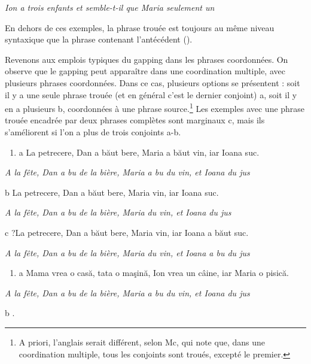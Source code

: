 {\itshape
Ion a trois enfants et semble-t-il que Maria seulement un} 

En dehors de ces exemples, la phrase trouée est toujours au même niveau syntaxique que la phrase contenant l'antécédent (\citet{Lobeck1995}).

Revenons aux emplois typiques du gapping dans les phrases coordonnées. On observe que le gapping peut apparaître dans une coordination multiple, avec plusieurs phrases coordonnées. Dans ce cas, plusieurs options se présentent : soit il y a une seule phrase trouée (et en général c'est le dernier conjoint) a, soit il y en a plusieurs b, coordonnées à une phrase source.\footnote{A priori, l'anglais serait différent, selon Mc\citet{Cawley1988}, qui note que, dans une coordination multiple, tous les conjoints sont troués, excepté le premier.} Les exemples avec une phrase trouée encadrée par deux phrases complètes sont marginaux c, mais ils s'améliorent si l'on a plus de trois conjoints a-b. 


\begin{enumerate}
\item \label{bkm:Ref289092187}a  La petrecere, Dan a băut bere, Maria a băut vin, iar Ioana suc.


\end{enumerate}
{\itshape
A la fête, Dan a bu de la bière, Maria a bu du vin, et Ioana du jus  } 

  b  La petrecere, Dan a băut bere, Maria vin, iar Ioana suc.

{\itshape
A la fête, Dan a bu de la bière, Maria du vin, et Ioana du jus } 

  c  ?La petrecere, Dan a băut bere, Maria vin, iar Ioana a băut suc.

{\itshape
A la fête, Dan a bu de la bière, Maria du vin, et Ioana a bu du jus}


\begin{enumerate}
\item \label{bkm:Ref289092617}a  Mama vrea o casă, tata o maşină, Ion vrea un câine, iar Maria o pisică.


\end{enumerate}
{\itshape
  A la fête, Dan a bu de la bière, Maria a bu du vin, et Ioana du jus}

  b    .\textstyleapplestylespan{} 


